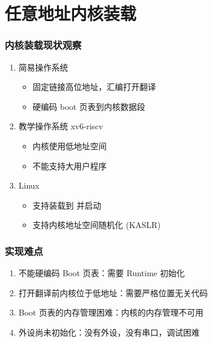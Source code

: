 \section{任意地址内核装载}


\begin{frame}
    \frametitle{内核装载现状观察}

    \begin{enumerate}
        \item 简易操作系统
              \begin{itemize}
                  \item 固定链接高位地址，汇编打开翻译
                  \item 硬编码 boot 页表到内核数据段
              \end{itemize}
        \item 教学操作系统 xv6-riscv
              \begin{itemize}
                  \item 内核使用低地址空间
                  \item 不能支持大用户程序
              \end{itemize}
        \item Linux
              \begin{itemize}
                  \item 支持装载到  并启动
                  \item 支持内核地址空间随机化 (KASLR)
              \end{itemize}
    \end{enumerate}

\end{frame}

\begin{frame}
    \frametitle{实现难点}

    \begin{enumerate}
        \item 不能硬编码 Boot 页表：需要 Runtime 初始化
        \item 打开翻译前内核位于低地址：需要严格位置无关代码
        \item Boot 页表的内存管理困难：内核的内存管理不可用
        \item 外设尚未初始化：没有外设，没有串口，调试困难
    \end{enumerate}

\end{frame}

